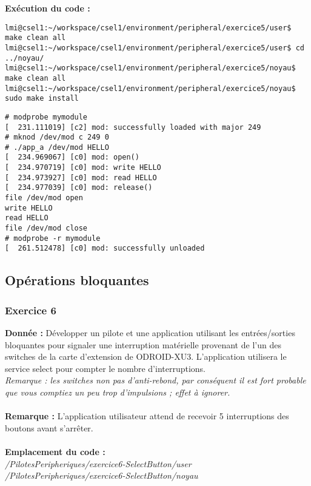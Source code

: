 \textbf{Exécution du code : } \\
\begin{lstlisting}
lmi@csel1:~/workspace/csel1/environment/peripheral/exercice5/user$ make clean all
lmi@csel1:~/workspace/csel1/environment/peripheral/exercice5/user$ cd ../noyau/
lmi@csel1:~/workspace/csel1/environment/peripheral/exercice5/noyau$ make clean all
lmi@csel1:~/workspace/csel1/environment/peripheral/exercice5/noyau$ sudo make install
\end{lstlisting}
\begin{lstlisting}
# modprobe mymodule                                                             
[  231.111019] [c2] mod: successfully loaded with major 249    
# mknod /dev/mod c 249 0                  
# ./app_a /dev/mod HELLO                                                        
[  234.969067] [c0] mod: open()                                                 
[  234.970719] [c0] mod: write HELLO                                            
[  234.973927] [c0] mod: read HELLO                                             
[  234.977039] [c0] mod: release()                                              
file /dev/mod open                                                              
write HELLO                                                                     
read HELLO                                                                      
file /dev/mod close                                                             
# modprobe -r mymodule                                                          
[  261.512478] [c0] mod: successfully unloaded
\end{lstlisting}

\subsection{Opérations bloquantes}
\subsubsection{Exercice 6}
\textbf{Donnée : } Développer	un pilote	et	une	application	utilisant	les	entrées/sorties	bloquantes	pour	signaler	une	
interruption	matérielle provenant	de	l’un	des	switches	de	la	carte	d’extension	de	ODROID-XU3.
L’application	utilisera	le	service	select	pour	compter	le	nombre	d’interruptions.\\
\textit{Remarque :	les	switches	non	pas	d’anti-rebond,	par	conséquent il	est	fort	probable	que	vous	
comptiez	un	peu	trop	d’impulsions ;	effet	à	ignorer.	}
\\\\
\textbf{Remarque : }L'application utilisateur attend de recevoir 5 interruptions des boutons avant s'arrêter.\\\\
\textbf{Emplacement du code : }\\ \textit{/PilotesPeripheriques/exercice6-SelectButton/user}\\
\textit{/PilotesPeripheriques/exercice6-SelectButton/noyau}\\

